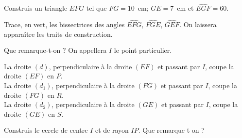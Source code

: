 \begin{myenumerate}
\item Construis un triangle $EFG$ tel que $FG=10$~cm; $GE=7$~cm et
$\widehat{EGF}=60$\degres.
\item Trace, en vert, les bissectrices des angles
$\widehat{EFG}$, $\widehat{FGE}$, $\widehat{GEF}$. On laissera
apparaître les traits de construction.
\item Que remarque-t-on ? On appellera $I$ le point particulier.
\item La droite $(d)$, perpendiculaire à la droite $(EF)$ et passant
par $I$, coupe la droite $(EF)$ en $P$.\\La droite $(d_1)$,
perpendiculaire à la droite $(FG)$ et passant par $I$, coupe la droite
$(FG)$ en $R$.\\ La droite $(d_2)$, perpendiculaire à la droite $(GE)$
et passant par $I$, coupe la droite $(GE)$ en $S$.\par Construis le
cercle de centre $I$ et de rayon $IP$. Que remarque-t-on ?
\end{myenumerate}